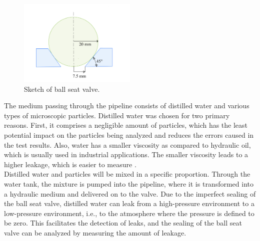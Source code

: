 \begin{figure}[htbp]
    \centering
    \includegraphics[width=0.5\textwidth]{figures/BallSeatValve/ballseatvalve.jpg}
    \caption{Sketch of ball seat valve.}
    \label{fig:ballseatvalve}
\end{figure}


The medium passing through the pipeline consists of distilled water and various types of microscopic particles. Distilled water
was chosen for two primary reasons. First, it comprises a negligible amount of particles,
which has the least potential impact on the particles being analyzed and reduces the 
errors caused in the test results. Also, water has a smaller viscosity as compared to
hydraulic oil, which is usually used in industrial applications. 
The smaller viscosity leads to a higher leakage, which is easier to measure \cite{fischer2021influence}.\\


Distilled water and particles will be mixed in a specific proportion. 
Through the water tank, the mixture is pumped into the pipeline, where 
it is transformed into a hydraulic medium and delivered on to the valve. 
Due to the imperfect sealing of the ball seat valve, distilled water can leak 
from a high-pressure environment to a low-pressure environment, i.e., to the 
atmosphere where the pressure is defined to be zero. This facilitates the detection of leaks, 
and the sealing of the ball seat valve can be analyzed by measuring the amount of leakage.\\

